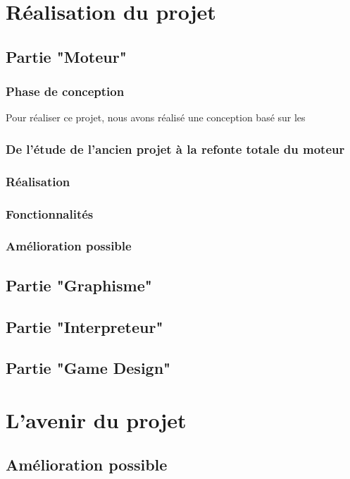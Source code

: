 \documentclass{report}
\begin{document}
\newpage
\part{Réalisation du projet}
\newpage
\chapter{Partie "Moteur"}
\section{Phase de conception}
Pour réaliser ce projet, nous avons réalisé une conception basé sur les 
\section{De l'étude de l'ancien projet à la refonte totale du moteur}
\section{Réalisation}
\section{Fonctionnalités}
\section{Amélioration possible}

\newpage
\chapter{Partie "Graphisme"}

\newpage
\chapter{Partie "Interpreteur"}

\newpage
\chapter{Partie "Game Design"}

\newpage
\part{L'avenir du projet}
\chapter{Amélioration possible}

%
%
\end{document}
